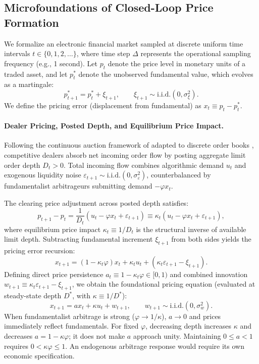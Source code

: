\documentclass[12pt]{article}
\theoremstyle{definition}
\theoremstyle{remark}
\begin{document}
\subsection{Microfoundations of Closed-Loop Price Formation}
We formalize an electronic financial market sampled at discrete uniform time intervals $t \in \{0, 1, 2, \dots\}$, where time step $\Delta$ represents the operational sampling frequency (e.g., 1 second). Let $p_t$ denote the price level in monetary units of a traded asset, and let $p_t^*$ denote the unobserved fundamental value, which evolves as a martingale:
\begin{equation}
p_{t+1}^* = p_t^* + \xi_{t+1}, \qquad \xi_{t+1} \sim \text{i.i.d.}(0, \sigma_\xi^2).
\label{eq:fundamental_process}
\end{equation}
We define the pricing error (displacement from fundamental) as $x_t \equiv p_t - p_t^*$.

\paragraph{Dealer Pricing, Posted Depth, and Equilibrium Price Impact.}
Following the continuous auction framework of \citet{kyle1985continuous} adapted to discrete order books \citep{glosten1985bid,hasbrouck1991,bouchaud2004fluctuations}, competitive dealers absorb net incoming order flow by posting aggregate limit order depth $D_t > 0$. Total incoming flow combines algorithmic demand $u_t$ and exogenous liquidity noise $\varepsilon_{t+1} \sim \text{i.i.d.}(0, \sigma_\varepsilon^2)$, counterbalanced by fundamentalist arbitrageurs submitting demand $-\varphi x_t$.

The clearing price adjustment across posted depth satisfies:
\begin{equation}
p_{t+1} - p_t = \frac{1}{D_t} \left( u_t - \varphi x_t + \varepsilon_{t+1} \right) \equiv \kappa_t \left( u_t - \varphi x_t + \varepsilon_{t+1} \right),
\end{equation}
where equilibrium price impact $\kappa_t \equiv 1/D_t$ is the structural inverse of available limit depth. Subtracting fundamental increment $\xi_{t+1}$ from both sides yields the pricing error recursion:
\begin{equation}
x_{t+1} = (1 - \kappa_t \varphi) x_t + \kappa_t u_t + \left( \kappa_t \varepsilon_{t+1} - \xi_{t+1} \right).
\end{equation}
Defining direct price persistence $a_t \equiv 1 - \kappa_t \varphi \in [0, 1)$ and combined innovation $w_{t+1} \equiv \kappa_t \varepsilon_{t+1} - \xi_{t+1}$, we obtain the foundational pricing equation (evaluated at steady-state depth $D^*$, with $\kappa \equiv 1/D^*$):
\begin{equation}
x_{t+1} = a x_t + \kappa u_t + w_{t+1}, \qquad w_{t+1} \sim \text{i.i.d.}(0, \sigma_w^2).
\label{eq:micro_pricing}
\end{equation}
When fundamentalist arbitrage is strong ($\varphi \to 1/\kappa$), $a \to 0$ and prices immediately reflect fundamentals. For fixed $\varphi$, decreasing depth increases $\kappa$ and decreases $a=1-\kappa\varphi$; it does not make $a$ approach unity. Maintaining $0\le a<1$ requires $0<\kappa\varphi\le1$. An endogenous arbitrage response would require its own economic specification.
\end{document}

